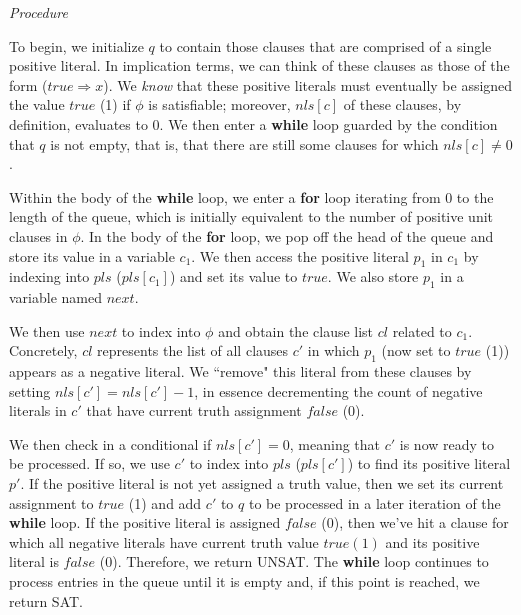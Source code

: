 \documentclass{article}
\begin{document}
\bigskip
\noindent \emph{Procedure}

\medskip
\noindent To begin, we initialize $q$ to contain those clauses that are comprised of a single positive literal. In implication terms, we can think of these clauses as those of the form ($true \Rightarrow x$). We \emph{know} that these positive literals must eventually be assigned the value $true$ (1) if $\phi$ is satisfiable; moreover, $nls[c]$ of these clauses, by definition, evaluates to 0. We then enter a \textbf{while} loop guarded by the condition that $q$ is not empty, that is, that there are still some clauses for which $nls[c] \neq 0$.

\medskip
\noindent Within the body of the \textbf{while} loop, we enter a \textbf{for} loop iterating from 0 to the length of the queue, which is initially equivalent to the number of positive unit clauses in $\phi$. In the body of the \textbf{for} loop, we pop off the head of the queue and store its value in a variable $c_1$. We then access the positive literal $p_1$ in $c_1$ by indexing into $pls$ ($pls[c_1]$) and set its value to $true$. We also store $p_1$ in a variable named $next$.

\medskip
\noindent We then use $next$ to index into $\phi$ and obtain the clause list $cl$ related to $c_1$. Concretely, $cl$ represents the list of all clauses $c'$ in which $p_1$ (now set to $true$ (1)) appears as a negative literal. We ``remove" this literal from these clauses by setting $nls[c'] = nls[c'] - 1$, in essence decrementing the count of negative literals in $c'$ that have current truth assignment $false$ (0).

\medskip
\noindent We then check in a conditional if $nls[c'] = 0$, meaning that $c'$ is now ready to be processed. If so, we use $c'$ to index into $pls$ ($pls[c']$) to find its positive literal $p'$. If the positive literal is not yet assigned a truth value, then we set its current assignment to $true$ (1) and add $c'$ to $q$ to be processed in a later iteration of the \textbf{while} loop. If the positive literal is assigned $false$ (0), then we've hit a clause for which all negative literals have current truth value $true (1)$ and its positive literal is $false$ (0). Therefore, we return UNSAT. The \textbf{while} loop continues to process entries in the queue until it is empty and, if this point is reached, we return SAT.
\end{document}
